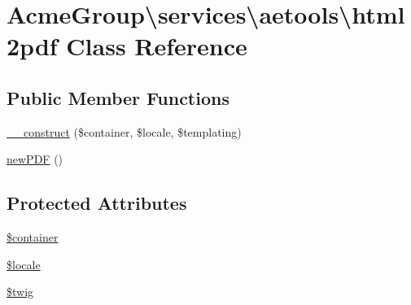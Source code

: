 \hypertarget{class_acme_group_1_1services_1_1aetools_1_1html2pdf}{\section{Acme\+Group\textbackslash{}services\textbackslash{}aetools\textbackslash{}html2pdf Class Reference}
\label{class_acme_group_1_1services_1_1aetools_1_1html2pdf}
}
\subsection*{Public Member Functions}
\begin{DoxyCompactItemize}
\item 
\hyperlink{class_acme_group_1_1services_1_1aetools_1_1html2pdf_a7a945f0432a92c1a803de3e5b0d37bb8}{\+\_\+\+\_\+construct} (\$container, \$locale, \$templating)
\item 
\hyperlink{class_acme_group_1_1services_1_1aetools_1_1html2pdf_aaad46014afc32c8755b0389dc7f1ffc7}{new\+P\+D\+F} ()
\end{DoxyCompactItemize}
\subsection*{Protected Attributes}
\begin{DoxyCompactItemize}
\item 
\hyperlink{class_acme_group_1_1services_1_1aetools_1_1html2pdf_ab2f9d51ae95931d4c0bf10c253014ae2}{\$container}
\item 
\hyperlink{class_acme_group_1_1services_1_1aetools_1_1html2pdf_a31895609923796f657530aaffdbc1523}{\$locale}
\item 
\hyperlink{class_acme_group_1_1services_1_1aetools_1_1html2pdf_afd529755f5297ccdb88cbc79bbd53c5a}{\$twig}
\end{DoxyCompactItemize}


